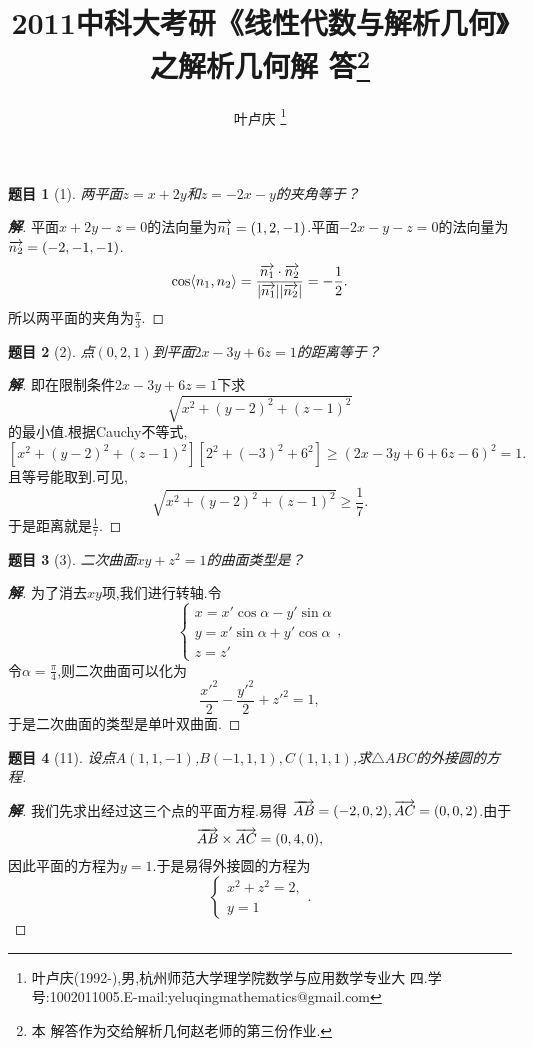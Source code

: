 ﻿\documentclass[a4paper]{article}
\newtheorem*{exe}{题目}
\newenvironment{exercise}
{\bigskip\begin{mdframed}\begin{exe}}
    {\end{exe}\end{mdframed}\bigskip}
\numberwithin{equation}{section}
\begin{document}
\title{{\bf{2011中科大考研《线性代数与解析几何》之解析几何解
      答\footnote{本
        解答作为交给解析几何赵老师的第三份作业.}}}} \author{\small{叶卢庆
    \footnote{叶卢庆(1992-),男,杭州师范大学理学院数学与应用数学专业大
      四.学号:1002011005.E-mail:yeluqingmathematics@gmail.com}}}
\maketitle
\begin{exercise}[1]
两平面$z=x+2y$和$z=-2x-y$的夹角等于？  
\end{exercise}
\begin{proof}[\textbf{解}]
平面$x+2y-z=0$的法向量为$\overrightarrow{n_1}=(1,2,-1)$.平面$-2x-y-z=0$的法向量为
$\overrightarrow{n_2}=(-2,-1,-1)$.
$$
\cos\langle n_1,n_2\rangle=\frac{\overrightarrow{n_1}\cdot \overrightarrow{n_2}}{|\overrightarrow{n_1}||\overrightarrow{n_2}|}=-\frac{1}{2}.
$$
所以两平面的夹角为$\frac{\pi}{3}$.  
\end{proof}
\begin{exercise}[2]
点$(0,2,1)$到平面$2x-3y+6z=1$的距离等于？  
\end{exercise}
\begin{proof}[\textbf{解}]
即在限制条件$2x-3y+6z=1$下求
$$
\sqrt{x^2+(y-2)^2+(z-1)^2}
$$
的最小值.根据Cauchy不等式,
$$
[x^2+(y-2)^2+(z-1)^2][2^2+(-3)^2+6^2]\geq (2x-3y+6+6z-6)^2=1.
$$
且等号能取到.可见,
$$
\sqrt{x^2+(y-2)^2+(z-1)^2}\geq \frac{1}{7}.
$$
于是距离就是$\frac{1}{7}$.
\end{proof}
\begin{exercise}[3]
  二次曲面$xy+z^2=1$的曲面类型是？
\end{exercise}
\begin{proof}[\textbf{解}]
  为了消去$xy$项,我们进行转轴.令
$$
\begin{cases}
  x=x'\cos\alpha-y'\sin\alpha\\
y=x'\sin\alpha+y'\cos\alpha\\
z=z'
\end{cases},
$$
令$\alpha=\frac{\pi}{4}$,则二次曲面可以化为
$$
\frac{x'^2}{2}-\frac{y'^2}{2}+z'^2=1,
$$
于是二次曲面的类型是单叶双曲面.
\end{proof}
\begin{exercise}[11]
  设点$A(1,1,-1)$,$B(-1,1,1),C(1,1,1)$,求$\triangle ABC$的外接圆的方程.
\end{exercise}
\begin{proof}[\textbf{解}]
我们先求出经过这三个点的平面方程.易得
$\overrightarrow{AB}=(-2,0,2),\overrightarrow{AC}=(0,0,2)$.由于
$$
\overrightarrow{AB}\times \overrightarrow{AC}=(0,4,0),
$$
因此平面的方程为$y=1$.于是易得外接圆的方程为
$$
\begin{cases}
  x^2+z^2=2,\\
y=1
\end{cases}.
$$
\end{proof}
\end{document}
